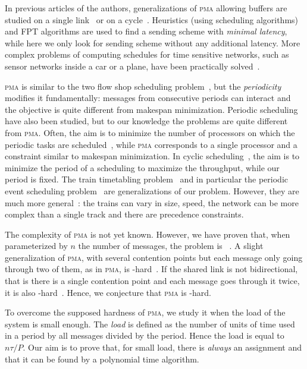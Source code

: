 \documentclass[10pt, conference, letterpaper]{algotel}
\newcommand\pma{\textsc{pma}\xspace}
\begin{document}
In previous articles of the authors, generalizations of \pma allowing buffers are studied on a single link~\cite{dominique2018deterministic} or on a cycle~\cite{Guir1905:Deterministic}. Heuristics (using scheduling algorithms) and FPT algorithms are used to find a sending scheme with \emph{minimal latency}, while here we only look for sending scheme without any additional latency. More complex problems of computing schedules for time sensitive networks, such as sensor networks inside a car or a plane, have been practically solved~\cite{nayak2017incremental,steiner2018traffic,dos2019tsnsched}. 

\pma is similar to the two flow shop scheduling problem~\cite{yu2004minimizing}, 
but the \emph{periodicity} modifies it fundamentally: messages from consecutive periods can interact and the objective is quite different from makespan minimization.
Periodic scheduling have also been studied, but to our knowledge the problems are quite different from \pma. Often, the aim is to minimize the number of processors on which the periodic tasks are scheduled~\cite{korst1991periodic,hanen1993cyclic}, while \pma corresponds to a single processor and a constraint similar to makespan minimization. In cyclic scheduling~\cite{levner2010complexity}, the aim is to minimize the period of a scheduling to maximize the throughput, while our period is fixed. The train timetabling problem~\cite{lusby2011railway} and in particular the periodic event scheduling problem~\cite{serafini1989mathematical} are generalizations of our problem. However, they are much more general~\cite{lusby2011railway}: the trains can vary in size, speed, the network can be more complex than a single track and there are precedence constraints.


The complexity of \pma is not yet known. However, we have proven that, when parameterized by
$n$ the number of messages, the problem is \FPT~\cite{barth2018deterministic}.
A slight generalization of \pma, with several contention points but each message only going through two of them, as in \pma, is \NP-hard~\cite{barth2018deterministic}. If the shared link is not bidirectional, that is there is a single contention point and each message goes through it twice, it is also \NP-hard~\cite{orman1997complexity}. Hence, we conjecture that \pma is \NP-hard.

To overcome the supposed hardness of \pma, we study it when the load of the system is small enough. The \emph{load} is defined as the number of units of time used in a period by all messages divided by the period. Hence the load is equal to $n\tau /P$. Our aim is to prove that, for small load, there is \emph{always} an assignment and that it can be found by a polynomial time algorithm.
\end{document}
